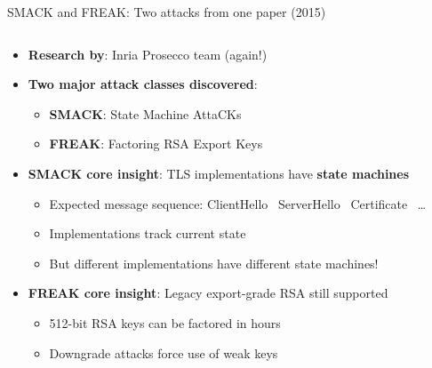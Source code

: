 \documentclass[aspectratio=169, lualatex, handout]{beamer}
\begin{document}
\begin{frame}{SMACK and FREAK: Two attacks from one paper (2015)}
	\begin{columns}[c]
		\begin{column}{1\textwidth}
			\begin{itemize}[<+->]
				\item \textbf{Research by}: Inria Prosecco team (again!)
				\item \textbf{Two major attack classes discovered}:
				      \begin{itemize}
					      \item \textbf{SMACK}: State Machine AttaCKs
					      \item \textbf{FREAK}: Factoring RSA Export Keys
				      \end{itemize}
				\item \textbf{SMACK core insight}: TLS implementations have \textbf{state machines}
				      \begin{itemize}
					      \item Expected message sequence: ClientHello \rightarrow\ ServerHello \rightarrow\ Certificate \rightarrow\ \ldots
					      \item Implementations track current state
					      \item But different implementations have different state machines!
				      \end{itemize}
				\item \textbf{FREAK core insight}: Legacy export-grade RSA still supported
				      \begin{itemize}
					      \item 512-bit RSA keys can be factored in hours
					      \item Downgrade attacks force use of weak keys
				      \end{itemize}
			\end{itemize}
		\end{column}
	\end{columns}
\end{frame}
\end{document}
